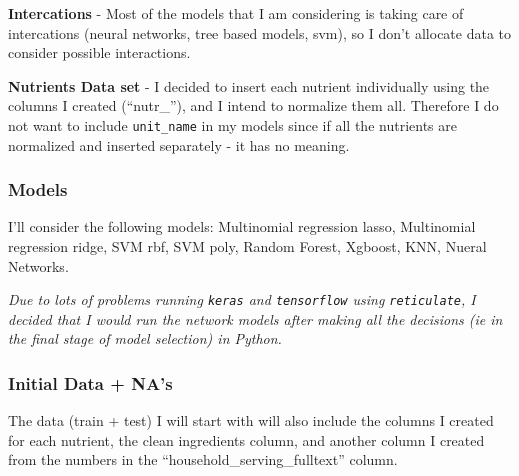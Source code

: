 \documentclass[
]{article}
\begin{document}
\textbf{Intercations} - Most of the models that I am considering is
taking care of intercations (neural networks, tree based models, svm),
so I don't allocate data to consider possible interactions.

\textbf{Nutrients Data set} - I decided to insert each nutrient
individually using the columns I created (``nutr\_''), and I intend to
normalize them all. Therefore I do not want to include
\texttt{unit\_name} in my models since if all the nutrients are
normalized and inserted separately - it has no meaning.

\hypertarget{models}{%
\subsubsection{Models}\label{models}}

I'll consider the following models: Multinomial regression lasso,
Multinomial regression ridge, SVM rbf, SVM poly, Random Forest, Xgboost,
KNN, Nueral Networks.

\emph{Due to lots of problems running \texttt{keras} and
\texttt{tensorflow} using \texttt{reticulate}, I decided that I would
run the network models after making all the decisions (ie in the final
stage of model selection) in Python.}

\hypertarget{initial-data-nas}{%
\subsubsection{Initial Data + NA's}\label{initial-data-nas}}

The data (train + test) I will start with will also include the columns
I created for each nutrient, the clean ingredients column, and another
column I created from the numbers in the
``household\_serving\_fulltext'' column.
\end{document}
